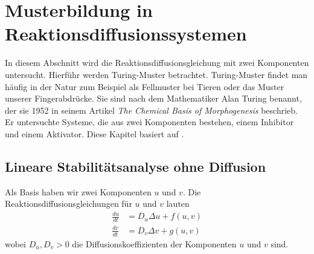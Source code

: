 %
%
%
%
\section{Musterbildung in Reaktionsdiffusionssystemen
\label{reaktdiff:section:teil1}}
In diesem Abschnitt wird die Reaktionsdiffusionsgleichung mit zwei Komponenten
untersucht.
Hierführ werden Turing-Muster betrachtet.
Turing-Muster findet man häufig in der Natur zum Beispiel als Fellmuster bei Tieren oder  das Muster unserer Fingerabdrücke.
Sie sind nach dem Mathematiker Alan Turing benannt, der sie 1952 in seinem Artikel \textit{The Chemical Basis of Morphogenesis} beschrieb.
Er untersuchte Systeme, die aus zwei Komponenten bestehen, einem Inhibitor und einem Aktivator.
Diese Kapitel basiert auf \cite{reaktdiff:turing_patterns_2019} \cite{reaktdiff:hoyle2006pattern}.

\subsection{Lineare Stabilitätsanalyse ohne Diffusion
\label{reaktdiff:subsection:mathe}}
Als Basis haben wir zwei Komponenten \(u\) und \(v\).
Die Reaktionsdiffusionsgleichungen für \(u\) und \(v\) lauten
\begin{align}
    \label{reaktdiff:equation:reaktdiff2}
    \frac{du}{dt} &= D_u \Delta u + f(u,v)\\
    \frac{dv}{dt} &= D_v \Delta v + g(u,v)
\end{align}
wobei \(D_u, D_v > 0\) die Diffusionskoeffizienten der Komponenten \(u\) und \(v\) sind.

